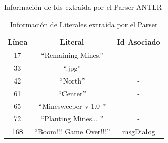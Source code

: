 \documentclass[a4paper,12pt]{report}
\begin{document}
\begin{table}
   \caption{Información de Ids extraída por el Parser ANTLR}
   \label{tabla2}
     
\end{table} 





\begin{table}[h!]
	
		\centering
   		\begin{tabular}{| c | c | c |}      
       \hline
  	   \textsf{Línea} & \textsf{Literal} & \textsf{Id Asociado} \\ \hline
17&“Remaining Mines.”&- \\ \hline
33&“.jpg”&- \\ \hline
42&“North”&- \\ \hline
61&“Center”&- \\ \hline
65&“Minesweeper v 1.0 ”&- \\ \hline
72&“Planting Mines... ”&- \\ \hline
168&“Boom!!! Game Over!!!”&msgDialog \\ \hline

  \end{tabular} 
	 
   \caption{Información de Literales extraída por el Parser}
   \label{tabla3}
     
\end{table} 
\end{document}
